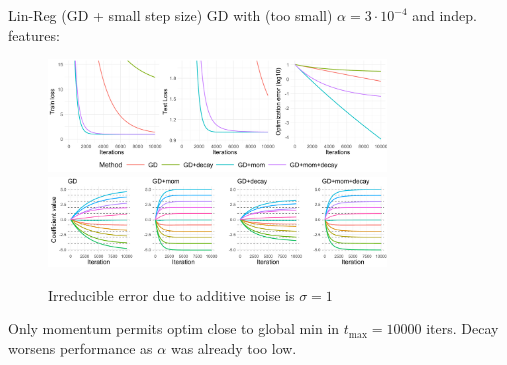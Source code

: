 \documentclass[11pt,compress,t,notes=noshow, xcolor=table]{beamer}
\begin{document}
\begin{vbframe}{Lin-Reg (GD + small step size)}
\vspace{-0.4cm}
GD with (too small) $\alpha=3\cdot10^{-4}$ and indep. features:
\begin{figure}
            \includegraphics[width=0.8\textwidth]{slides/04-multivariate-first-order/figure_man/simu_linmod/GD_reg_small_lr_iters.pdf} \\
             \includegraphics[width=0.8\textwidth]{slides/04-multivariate-first-order/figure_man/simu_linmod/GD_reg_coef_small.pdf}\\
            \begin{footnotesize}
                Irreducible error due to additive noise is $\sigma=1$
            \end{footnotesize}
\end{figure}
Only momentum permits optim close to global min in $t_{\text{max}}=10000$ iters. Decay worsens performance as $\alpha$ was already too low.
\end{vbframe}
\end{document}
